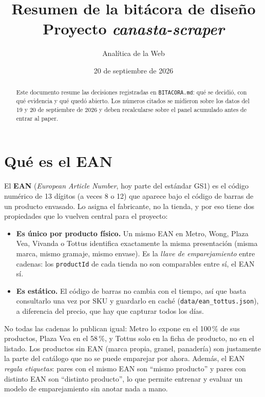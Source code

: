 \documentclass[11pt,a4paper]{article}
\title{Resumen de la bitácora de diseño\\\large Proyecto \emph{canasta-scraper}}
\author{Analítica de la Web}
\date{20 de septiembre de 2026}
\begin{document}
\maketitle

\begin{abstract}
Este documento resume las decisiones registradas en \texttt{BITACORA.md}: qué se
decidió, con qué evidencia y qué quedó abierto. Los números citados se midieron
sobre los datos del 19 y 20 de septiembre de 2026 y deben recalcularse sobre el
panel acumulado antes de entrar al paper.
\end{abstract}

\section{Qué es el EAN}

El \textbf{EAN} (\emph{European Article Number}, hoy parte del estándar GS1) es el
código numérico de 13 dígitos (a veces 8 o 12) que aparece bajo el código de
barras de un producto envasado. Lo asigna el fabricante, no la tienda, y por eso
tiene dos propiedades que lo vuelven central para el proyecto:

\begin{itemize}[nosep]
  \item \textbf{Es único por producto físico.} Un mismo EAN en Metro, Wong, Plaza
        Vea, Vivanda o Tottus identifica exactamente la misma presentación
        (misma marca, mismo gramaje, mismo envase). Es la \emph{llave de
        emparejamiento} entre cadenas: los \texttt{productId} de cada tienda no
        son comparables entre sí, el EAN sí.
  \item \textbf{Es estático.} El código de barras no cambia con el tiempo, así
        que basta consultarlo una vez por SKU y guardarlo en caché
        (\texttt{data/ean\_tottus.json}), a diferencia del precio, que hay que
        capturar todos los días.
\end{itemize}

No todas las cadenas lo publican igual: Metro lo expone en el 100\,\% de sus
productos, Plaza Vea en el 58\,\%, y Tottus solo en la ficha de producto, no en el
listado. Los productos sin EAN (marca propia, granel, panadería) son justamente
la parte del catálogo que no se puede emparejar por ahora. Además, el EAN
\emph{regala etiquetas}: pares con el mismo EAN son ``mismo producto'' y pares con
distinto EAN son ``distinto producto'', lo que permite entrenar y evaluar un
modelo de emparejamiento sin anotar nada a mano.
\end{document}
